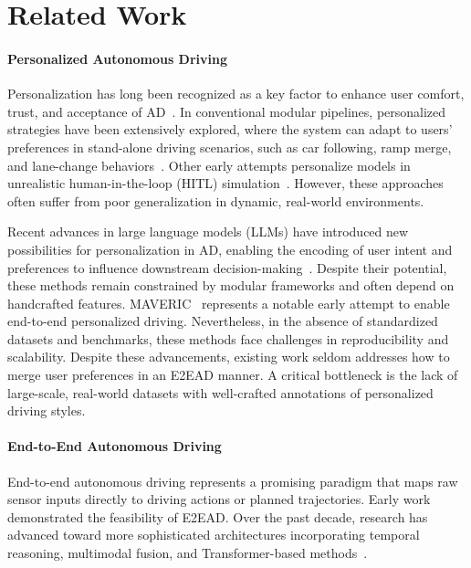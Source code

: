 \documentclass{article}
\begin{document}
\section{Related Work}
\paragraph{Personalized Autonomous Driving}
Personalization has long been recognized as a key factor to enhance user comfort, trust, and acceptance of AD~\cite{liao2024review}. In conventional modular pipelines, personalized strategies have been extensively explored, where the system can adapt to users' preferences in stand-alone driving scenarios, such as car following, ramp merge, and lane-change behaviors~\cite{zhao2022personalized, li2023personalized, liao2023driver}. Other early attempts personalize models in unrealistic human-in-the-loop (HITL) simulation~\cite{ke2024d2e}. However, these approaches often suffer from poor generalization in dynamic, real-world environments.

Recent advances in large language models (LLMs) have introduced new possibilities for personalization in AD, enabling the encoding of user intent and preferences to influence downstream decision-making~\cite{cui2024personalized, xu2024drivegpt4, kou2025padriver}. Despite their potential, these methods remain constrained by modular frameworks and often depend on handcrafted features. MAVERIC~\cite{schrum2024maveric} represents a notable early attempt to enable end-to-end personalized driving. Nevertheless, in the absence of standardized datasets and benchmarks, these methods face challenges in reproducibility and scalability. Despite these advancements, existing work seldom addresses how to merge user preferences in an E2EAD manner. A critical bottleneck is the lack of large-scale, real-world datasets with well-crafted annotations of personalized driving styles.

\paragraph{End-to-End Autonomous Driving}

End-to-end autonomous driving represents a promising paradigm that maps raw sensor inputs directly to driving actions or planned trajectories. Early work~\cite{ codevilla2018end} demonstrated the feasibility of E2EAD. Over the past decade, research has advanced toward more sophisticated architectures incorporating temporal reasoning, multimodal fusion, and Transformer-based methods~\cite{prakash2021multi, jia2023think, shao2023safety}.
\end{document}
